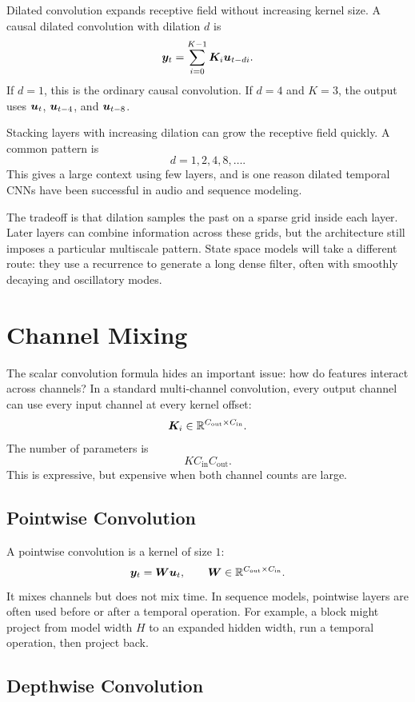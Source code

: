Dilated convolution expands receptive field without increasing kernel size. A causal
dilated convolution with dilation $d$ is
\[
  \bm{y}_t = \sum_{i=0}^{K-1} \bm{K}_i \bm{u}_{t-di}.
\]
If $d=1$, this is the ordinary causal convolution. If $d=4$ and $K=3$, the output uses
$\bm{u}_t$, $\bm{u}_{t-4}$, and $\bm{u}_{t-8}$.

Stacking layers with increasing dilation can grow the receptive field quickly. A common
pattern is
\[
  d = 1,2,4,8,\ldots.
\]
This gives a large context using few layers, and is one reason dilated temporal CNNs have
been successful in audio and sequence modeling.

The tradeoff is that dilation samples the past on a sparse grid inside each layer. Later
layers can combine information across these grids, but the architecture still imposes a
particular multiscale pattern. State space models will take a different route: they use a
recurrence to generate a long dense filter, often with smoothly decaying and oscillatory
modes.

\section{Channel Mixing}

The scalar convolution formula hides an important issue: how do features interact across
channels? In a standard multi-channel convolution, every output channel can use every
input channel at every kernel offset:
\[
  \bm{K}_i \in \mathbb{R}^{C_{\mathrm{out}} \times C_{\mathrm{in}}}.
\]
The number of parameters is
\[
  K C_{\mathrm{in}} C_{\mathrm{out}}.
\]
This is expressive, but expensive when both channel counts are large.

\subsection{Pointwise Convolution}

A pointwise convolution is a kernel of size $1$:
\[
  \bm{y}_t = \bm{W} \bm{u}_t,
  \qquad
  \bm{W} \in \mathbb{R}^{C_{\mathrm{out}} \times C_{\mathrm{in}}}.
\]
It mixes channels but does not mix time. In sequence models, pointwise layers are often
used before or after a temporal operation. For example, a block might project from model
width $H$ to an expanded hidden width, run a temporal operation, then project back.

\subsection{Depthwise Convolution}

